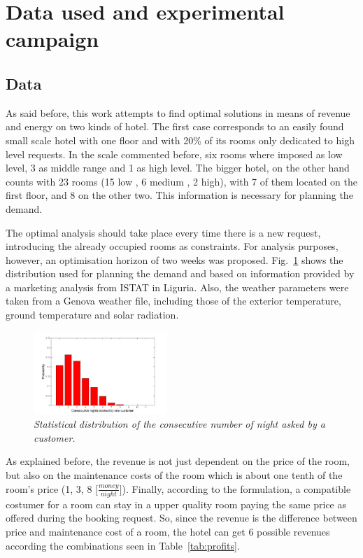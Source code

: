 \section{Data used and experimental campaign} \label{campaign}
\subsection{Data}
As said before, this work attempts to find optimal solutions in means of revenue and energy on two kinds of hotel. The first case corresponds to an easily found small scale hotel with one floor and with 20\% of its rooms only dedicated to high level requests. In the scale commented before, six rooms where imposed as low level, 3 as middle range and 1 as high level. The bigger hotel, on the other hand counts with 23 rooms (15 low , 6 medium , 2 high), with 7 of them located on the first floor, and 8 on the other two. This information is necessary for planning the demand.

The optimal analysis should take place every time there is a new request, introducing the already occupied rooms as constraints. For analysis purposes, however, an optimisation horizon of two weeks was proposed. Fig.~\ref{figDemand_stat} shows the distribution used for planning the demand and based on information provided by a marketing analysis from ISTAT \cite{istat} in Liguria. Also, the weather parameters were taken from a Genova weather file, including those of the exterior temperature, ground temperature and solar radiation. \cite{weather}

\begin{figure}[htbp]
	\centering
	\includegraphics[width=0.45\textwidth, height=0.22\textwidth]{img/Booking_probability1.png}
	\caption{\textit{Statistical distribution of the consecutive number of night asked by a customer.}}
	\label{figDemand_stat}
\end{figure}

As explained before, the revenue is not just dependent on the price of the room, but also on the maintenance costs of the room which is about one tenth of the room's price (1, 3, 8 [$\frac{money}{night}]$). Finally, according to the formulation, a compatible costumer for a room can stay in a upper quality room paying the same price as offered during the booking request. So, since the revenue is the difference between price and maintenance cost of a room, the hotel can get 6 possible revenues according the combinations seen in Table~\ref{tab:profits}.


